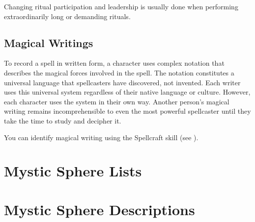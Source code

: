             Changing ritual participation and leadership is usually done when performing extraordinarily long or demanding rituals.

    \subsection{Magical Writings}
        To record a spell in written form, a character uses complex notation that describes the magical forces involved in the spell.
        The notation constitutes a universal language that spellcasters have discovered, not invented.
        Each writer uses this universal system regardless of their native language or culture.
        However, each character uses the system in their own way.
        Another person's magical writing remains incomprehensible to even the most powerful spellcaster until they take the time to study and decipher it.

        You can identify magical writing using the Spellcraft skill (see ).


\section{Mystic Sphere Lists}\label{Mystic Sphere Lists}

    

\section{Mystic Sphere Descriptions}\label{Mystic Sphere Descriptions}

    
